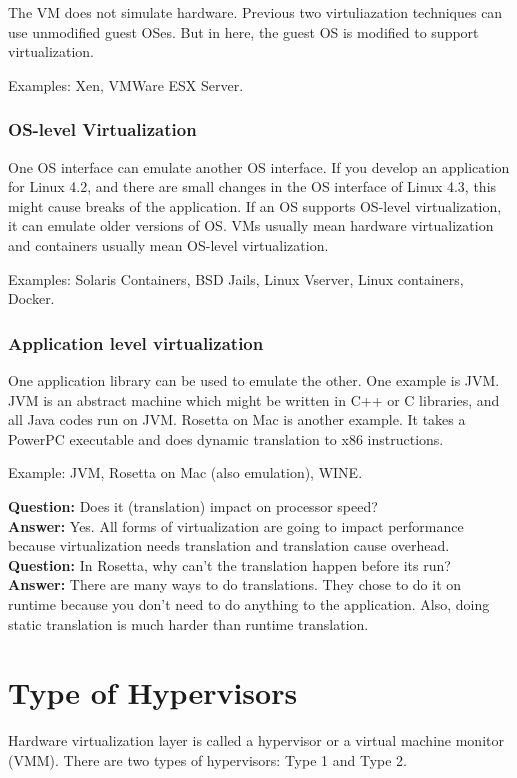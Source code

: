 \documentclass[twoside]{article}
\newcommand{\que}[1]{\textbf{Question:} #1\\}
\newcommand{\ans}[1]{\textbf{Answer:} #1\\}
\begin{document}
The VM does not simulate hardware. Previous two virtuliazation techniques can use unmodified guest OSes. But in here, the guest OS is modified to support virtualization.

Examples: Xen, VMWare ESX Server.

\subsubsection{OS-level Virtualization}

One OS interface can emulate another OS interface. If you develop an application for Linux 4.2, and there are small changes in the OS interface of Linux 4.3, this might cause breaks of the application. If an OS supports OS-level virtualization, it can emulate older versions of OS. VMs usually mean hardware virtualization and containers usually mean OS-level virtualization.

Examples: Solaris Containers, BSD Jails, Linux Vserver, Linux containers, Docker.

\subsubsection{Application level virtualization}

One application library can be used to emulate the other. One example is JVM. JVM is an abstract machine which might be written in C++ or C libraries, and all Java codes run on JVM. Rosetta on Mac is another example. It takes a PowerPC executable and does dynamic translation to x86 instructions.

Example: JVM, Rosetta on Mac (also emulation), WINE.

\que{Does it (translation) impact on processor speed?}
\ans{Yes. All forms of virtualization are going to impact performance because virtualization needs translation and translation cause overhead.}

\que{In Rosetta, why can't the translation happen before its run?}
\ans{There are many ways to do translations. They chose to do it on runtime because you don't need to do anything to the application. Also, doing static translation is much harder than runtime translation.}

\section{Type of Hypervisors}

Hardware virtualization layer is called a hypervisor or a virtual machine monitor (VMM). There are two types of hypervisors: Type 1 and Type 2.
\end{document}
